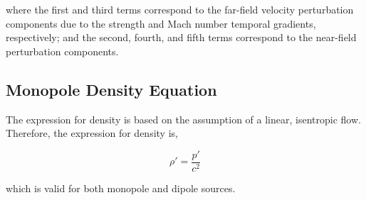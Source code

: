 where the first and third terms correspond to the far-field velocity perturbation components due to the strength and Mach number temporal gradients, respectively; and the second, fourth, and fifth terms correspond to the near-field perturbation components.

\subsection{Monopole Density Equation} \label{subsec:mono_rho}
The expression for density is based on the assumption of a linear, isentropic flow. Therefore, the expression for density is,

\begin{equation}
    \rho'=\frac{p'}{c^2}
    \label{eq:density}
\end{equation}

which is valid for both monopole and dipole sources. 